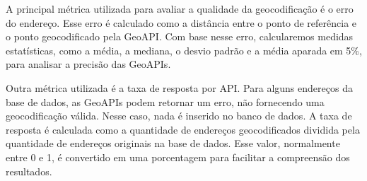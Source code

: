 A principal métrica utilizada para avaliar a qualidade da geocodificação é o erro do endereço. Esse erro é calculado como a distância entre o ponto de referência e o ponto geocodificado pela GeoAPI. Com base nesse erro, calcularemos medidas estatísticas, como a média, a mediana, o desvio padrão e a média aparada em 5\%, para analisar a precisão das GeoAPIs.

Outra métrica utilizada é a taxa de resposta por API. Para alguns endereços da base de dados, as GeoAPIs podem retornar um erro, não fornecendo uma geocodificação válida. Nesse caso, nada é inserido no banco de dados. A taxa de resposta é calculada como a quantidade de endereços geocodificados dividida pela quantidade de endereços originais na base de dados. Esse valor, normalmente entre 0 e 1, é convertido em uma porcentagem para facilitar a compreensão dos resultados.
